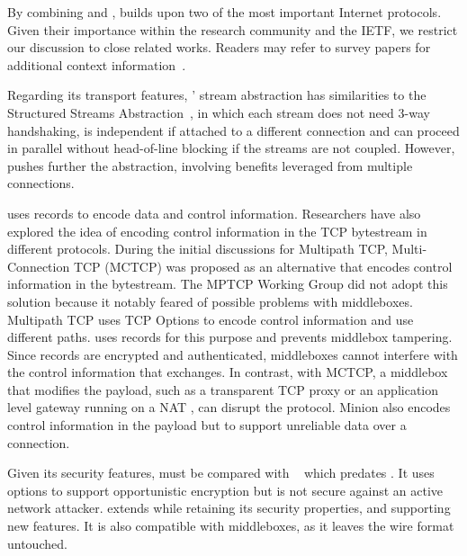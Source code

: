 
By combining \tcp and \tls, \tcpls builds upon two of the most important
Internet protocols. Given their importance within 
the research community and the IETF, we restrict our discussion to close
related works. Readers may refer to survey papers for additional 
context 
information~\cite{polese2019survey,li2016multipath,papastergiou2016ossifying}.

Regarding its transport features, \tcpls' stream abstraction has similarities to
the Structured Streams Abstraction~\cite{ford2007structured}, in which each
stream does not need 3-way handshaking, is independent if attached to a
different \tcp connection and can proceed in parallel without head-of-line
blocking if the streams are not coupled. However, \tcpls pushes further the
abstraction, involving benefits leveraged from multiple connections.

\tcpls uses \tls records to encode data and control information. Researchers
have also explored the idea of encoding control information in the TCP 
bytestream in
different protocols. During the initial discussions for Multipath TCP,
Multi-Connection TCP (MCTCP) \cite{draft-scharf-mptcp-mctcp-01}
was proposed as an alternative that encodes control information in the bytestream.
The MPTCP Working Group did not adopt this solution because it notably feared of
possible problems with middleboxes. Multipath TCP \cite{raiciu2012hard,rfc8684}
uses TCP Options to encode control information and use different paths. \tcpls
uses \tls records for this purpose and prevents middlebox tampering.
Since \tls records are encrypted and
authenticated, middleboxes cannot interfere with the control information that
\tcpls exchanges. In contrast, with MCTCP, a middlebox that modifies 
the payload, such as a transparent TCP proxy or an application level gateway 
running on a NAT \cite{rfc3027}, can disrupt the protocol.
Minion \cite{nowlan2012fitting} also encodes control information in the \tcp
payload but to support unreliable data over a connection.



Given its security features, \tcpls must be compared with 
\tcpcrypt~\cite{bittau2010case,rfc8548} which predates . It uses \tcp 
options to support opportunistic encryption but is not secure against an active 
network attacker. \tcpls extends \tls while retaining its security 
properties, and supporting new features. It is also compatible with \tcp 
middleboxes, as it leaves the \tcp wire format untouched.

